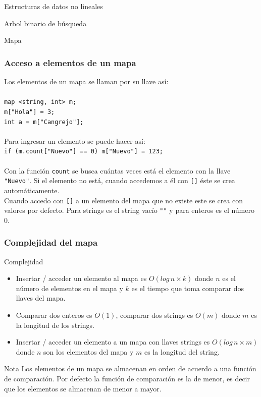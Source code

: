 \documentclass{beamer}
\begin{document}
\begin{section}{Estructuras de datos no lineales}
\begin{subsection}{Arbol binario de búsqueda}
\begin{subsubsection}{Mapa}
	\begin{frame}[fragile]
		\frametitle{Acceso a elementos de un mapa}
		Los elementos de un mapa se llaman por su llave así:\\ \quad \\
		\verb|map <string, int> m;|\\
		\verb|m["Hola"] = 3;|\\
		\verb|int a = m["Cangrejo"];|\\ \quad \\
		
		Para ingresar un elemento se puede hacer así:\\
		\verb|if (m.count["Nuevo"] == 0) m["Nuevo"] = 123;|\\ \quad \\
		Con la función \verb|count| se busca cuántas veces está el elemento con la llave \verb|"Nuevo"|. Si el elemento no está, cuando accedemos a él con \verb|[]| éste se crea automáticamente.\\
		Cuando accedo con \verb|[]| a un elemento del mapa que no existe este se crea con valores por defecto. Para strings es el string vacío \verb|""| y para enteros es el número 0.
	\end{frame}
	
	\begin{frame}
		\frametitle{Complejidad del mapa}
		\begin{block}{Complejidad}
			\begin{itemize}
				\item Insertar / acceder un elemento al mapa es $O(log\,n \times k)$ donde $n$ es el número de elementos en el mapa y $k$ es el tiempo que toma comparar dos llaves del mapa.
				\item Comparar dos enteros es $O(1)$, comparar dos strings es $O(m)$ donde $m$ es la longitud de los strings.
				\item Insertar / acceder un elemento a un mapa con llaves strings es $O(log\,n \times m)$ donde $n$ son los elementos del mapa y $m$ es la longitud del string.
			\end{itemize}
		\end{block}
		\begin{block}{Nota}
			Los elementos de un mapa se almacenan en orden de acuerdo a una función de comparación. Por defecto la función de comparación es la de menor, es decir que los elementos se almacenan de menor a mayor.
		\end{block}
	\end{frame}
	

\end{subsubsection}
\end{subsection}
\end{section}
\end{document}
